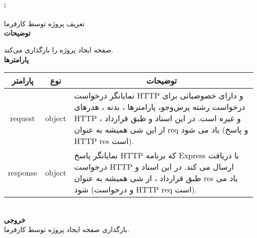 \paragraph{:}
تعریف پروژه‌ توسط کارفرما
\\
\textbf{توضیحات}
\hr
\begin{flushleft}
	\framebox[.9\textwidth][l]{
		\lr{
			\textcolor{type}{void}
			\textcolor{func}{getAddProject}
			\textcolor{symb}{(}
			\textcolor{type}{object}
			\textcolor{arg}{request}
			\textcolor{symb}{,}
			\textcolor{type}{object}
			\textcolor{arg}{response}
			\textcolor{symb}{);}
		}
	}
\end{flushleft}
صفحه ایجاد پروژه را بارگذاری می‌کند.
\\
\textbf{پارامترها}
\hr \\[10pt]
\begin{tabular}{|m{4cm}|m{3cm}|m{10cm}|}
	\hline
	\multicolumn{1}{|c}{پارامتر}
	&
	\multicolumn{1}{|c}{نوع}
	&
	\multicolumn{1}{|c|}{توضیحات}
	\\
	\hline
	\multicolumn{1}{|c}{request}
	&
	\multicolumn{1}{|c|}{object}
	&
	نمایانگر درخواست HTTP و دارای خصوصیاتی برای درخواست رشته پرس‌و‌جو، پارامترها ، بدنه ، هدرهای HTTP و غیره است.
	در این اسناد و طبق قرارداد ، از این شی همیشه به عنوان req یاد می شود (و پاسخ HTTP res است).
	\\
	\hline
	\multicolumn{1}{|c}{response}
	&
	\multicolumn{1}{|c|}{object}
	&
	نمایانگر پاسخ HTTP که برنامه Express با دریافت درخواست HTTP ارسال می کند.
	در این اسناد و طبق قرارداد ، از شی همیشه به عنوان res یاد می شود (و درخواست HTTP req است).
	\\
	\hline
\end{tabular}
\\[10pt]
\textbf{خروجی}
\hr \\
بارگذاری صفحه ایجاد پروژه توسط کارفرما.

